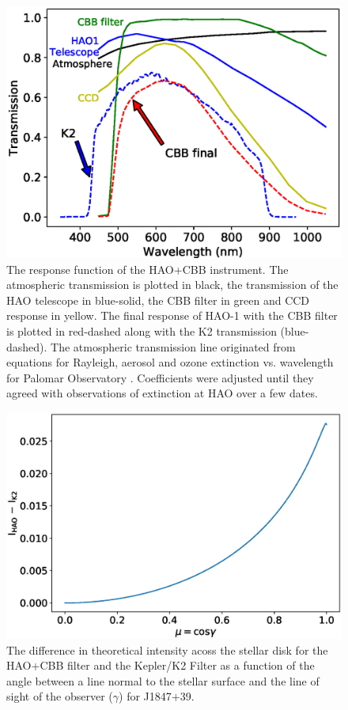 \begin{figure}[htb]

  \centering
  \includegraphics{6-images/CBB_response.eps}
  \caption{The response function of the HAO+CBB instrument. The atmospheric transmission is plotted in black, the transmission of the HAO telescope in blue-solid, the CBB filter in green and CCD response in yellow. The final response of HAO-1 with the CBB filter is plotted in red-dashed along with the K2 transmission (blue-dashed). The atmospheric transmission line originated from equations for Rayleigh, aerosol and ozone extinction vs. wavelength for Palomar Observatory \protect\citep{1975ApJ...197..593H}. Coefficients were adjusted until they agreed with observations of extinction at HAO over a few dates.}
  \label{HAO_CBB}
\end{figure}


\begin{figure}[htb]
  \centering
  \includegraphics[scale=0.8]{6-images/kepVShao.eps}
  \caption{The difference in theoretical intensity acoss the stellar disk for the HAO+CBB filter and the Kepler/K2 Filter as a function of the angle between a line normal to the stellar surface and the line of sight of the observer ($\gamma$) for J1847$+$39. }
  \label{kepVShao}
\end{figure}


